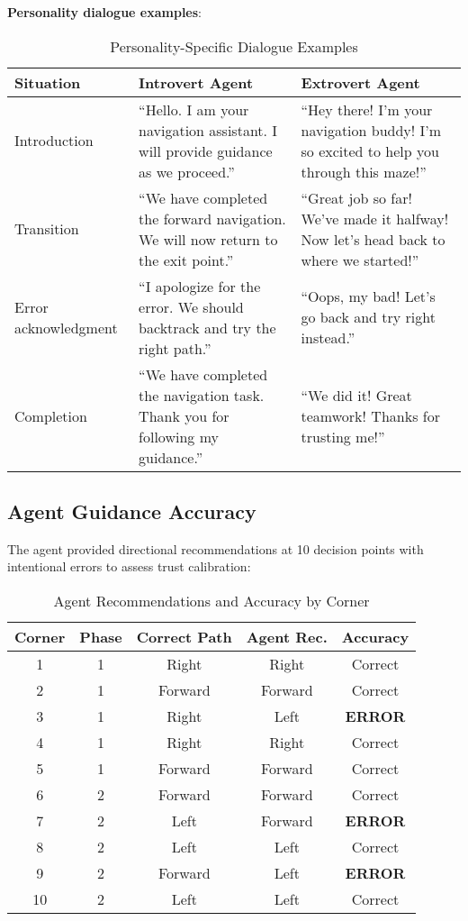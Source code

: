 \documentclass[12pt]{article}
\begin{document}
\textbf{Personality dialogue examples}:
\begin{table}[h]
\centering
\caption{Personality-Specific Dialogue Examples}
\begin{tabular}{p{}p{}p{}}
\toprule
\textbf{Situation} & \textbf{Introvert Agent} & \textbf{Extrovert Agent} \\
\midrule
Introduction & ``Hello. I am your navigation assistant. I will provide guidance as we proceed.'' & ``Hey there! I'm your navigation buddy! I'm so excited to help you through this maze!'' \\
\midrule
Transition & ``We have completed the forward navigation. We will now return to the exit point.'' & ``Great job so far! We've made it halfway! Now let's head back to where we started!'' \\
\midrule
Error acknowledgment & ``I apologize for the error. We should backtrack and try the right path.'' & ``Oops, my bad! Let's go back and try right instead.'' \\
\midrule
Completion & ``We have completed the navigation task. Thank you for following my guidance.'' & ``We did it! Great teamwork! Thanks for trusting me!'' \\
\bottomrule
\end{tabular}
\end{table}

\subsection{Agent Guidance Accuracy}

The agent provided directional recommendations at 10 decision points with intentional errors to assess trust calibration:

\begin{table}[h]
\centering
\caption{Agent Recommendations and Accuracy by Corner}
\begin{tabular}{ccccc}
\toprule
\textbf{Corner} & \textbf{Phase} & \textbf{Correct Path} & \textbf{Agent Rec.} & \textbf{Accuracy} \\
\midrule
1 & 1 & Right & Right & Correct \\
2 & 1 & Forward & Forward & Correct \\
3 & 1 & Right & Left & \textbf{ERROR} \\
4 & 1 & Right & Right & Correct \\
5 & 1 & Forward & Forward & Correct \\
\midrule
6 & 2 & Forward & Forward & Correct \\
7 & 2 & Left & Forward & \textbf{ERROR} \\
8 & 2 & Left & Left & Correct \\
9 & 2 & Forward & Left & \textbf{ERROR} \\
10 & 2 & Left & Left & Correct \\
\bottomrule
\end{tabular}
\end{table}
\end{document}
